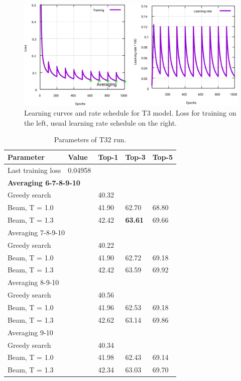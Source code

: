 \documentclass{article}
\begin{document}
\begin{figure}[h!]
  \centering
  \includegraphics[width = 16.5cm]{images/t3-2.pdf}
  \caption{Learning curves and rate schedule for T3 model. Loss for training on the left, usual learning rate schedule on the right.}
  \label{fig:t11}
\end{figure}

\begin{table}[h!]
\caption{Parameters of T32 run.}
  \centering
  \begin{tabular}{p{8.2cm}p{1.5cm}p{1.5cm}p{1.5cm}p{1.5cm}}
    \toprule
    Parameter & Value & Top-1 & Top-3 & Top-5 \\
    \midrule
    Last training loss & 0.04958 & & & \\
    \midrule
    \multicolumn{5}{l}{\textbf{Averaging 6-7-8-9-10}} \\ \midrule
    Greedy search  & & 40.32 & & \\
    Beam, T = 1.0  & & 41.90 & 62.70 & 68.80  \\
    Beam, T = 1.3 & & 42.42 & \textbf{63.61} & 69.66 \\ 
    \midrule
    \multicolumn{5}{l}{Averaging 7-8-9-10} \\ \midrule
    Greedy search  & & 40.22 & & \\
    Beam, T = 1.0  & & 41.90 & 62.72 & 69.18  \\
    Beam, T = 1.3 & & 42.42 & 63.59 & 69.92 \\ \midrule
    \multicolumn{5}{l}{Averaging 8-9-10} \\ \midrule
    Greedy search  & & 40.56 & & \\
    Beam, T = 1.0  & & 41.96 & 62.53 & 69.18  \\
    Beam, T = 1.3 & & 42.62 & 63.14 & 69.86 \\ \midrule
    \multicolumn{5}{l}{Averaging 9-10} \\ \midrule
    Greedy search  & & 40.34 & & \\
    Beam, T = 1.0  & & 41.98 & 62.43 & 69.14  \\
    Beam, T = 1.3 & & 42.34 & 63.03 & 69.70 \\ 
    \bottomrule
  \end{tabular}
  \label{tbl:t32}
\end{table} 
\end{document}
